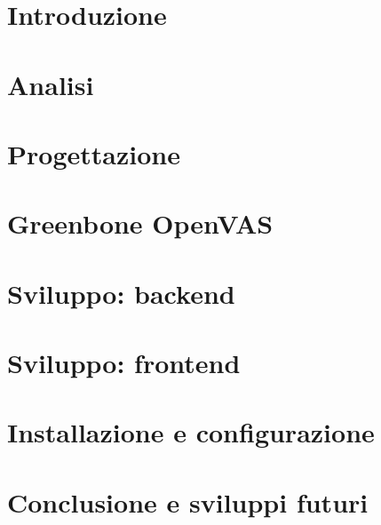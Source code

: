 \documentclass{report}
\begin{document}
    
    \tableofcontents
    \listoffigures
    \chapter{Introduzione}
    
    \chapter{Analisi}
    
    \chapter{Progettazione}
    
    \chapter{Greenbone OpenVAS}
    
    \chapter{Sviluppo: backend}
    \chapter{Sviluppo: frontend}
    \chapter{Installazione e configurazione}
    \chapter{Conclusione e sviluppi futuri}
\end{document}
